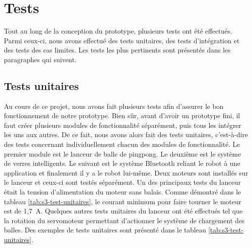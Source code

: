 \section{Tests}

Tout au long de la conception du prototype, plusieurs tests ont été effectués.
Parmi ceux-ci, nous avons effectué des tests unitaires, des tests d'intégration et des tests des cas limites.
Les tests les plus pertinents sont présentés dans les paragraphes qui suivent.

\subsection{Tests unitaires}

Au cours de ce projet, nous avons fait plusieurs tests afin d’assurer le bon fonctionnement de notre prototype.
Bien sûr, avant d’avoir un prototype fini, il faut créer plusieurs modules de fonctionnalité séparément, puis tous les intégrer les uns aux autres.
De ce fait, nous avons alors fait des tests unitaires, c’est-à-dire des tests concernant individuellement chacun des modules de fonctionnalité.
Le premier module est le lanceur de balle de pingpong.
Le deuxième est le système de verres intelligents.
Le suivant est le système Bluetooth reliant le robot à une application et finalement il y a le robot lui-même.
Deux moteurs sont installés sur le lanceur et ceux-ci sont testés séparément.
Un des principaux tests du lanceur était la tension d’alimentation du moteur sans balais.
Comme démontré dans le tableau \ref{tab:s3-test-unitaires}, le courant minimum pour faire tourner le moteur est de 1,7~A.
Quelques autres tests unitaires du lanceur ont été effectués tel que la rotation du servomoteur permettant d’actionner le système de chargement des balles.
Des exemples de tests unitaires sont présenté dans le tableau \ref{tab:s3-test-unitaires}.

